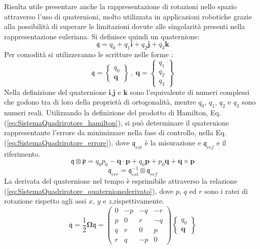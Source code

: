 Risulta utile presentare anche la rappresentazione di rotazioni nello spazio attraverso l'uso di quaternioni, molto utilizzata in applicazioni robotiche grazie alla possibilità di superare le limitazioni dovute alle singolarità presenti nella rappresentazione euleriana.
Si definisce quindi un quaternione:
\[ 
	\mathfrak{q} = q_0 + q_1 \mathbf{i} + q_2 \mathbf{j} + q_3 \mathbf{k}
\]
Per comodità si utilizzeranno le scritture nelle forme :
\[ 
	\mathfrak{q} = \begin{Bmatrix}
		q_0\\
		\mathbf{q}
	\end{Bmatrix} \ , \ \mathbf{q} = \begin{Bmatrix}
		q_1\\
		q_2\\
		q_3
	\end{Bmatrix}
\]
Nella definizione del quaternione $\mathbf{i}$,$\mathbf{j}$ e $\mathbf{k}$ sono l'equivalente di numeri complessi che godono tra di loro della proprietà di ortogonalità, mentre $q_0$, $q_1$, $q_2$ e $q_3$ sono numeri reali. Utilizzando la definizione del prodotto di Hamilton, Eq.  (\ref{eq:SistemaQuadrirotore_hamilton}), si può determinare il quaternione rappresentante l'errore da minimizzare nella fase di controllo, nella Eq. (\ref{eq:SistemaQuadrirotore_errore}), dove $\mathfrak{q}_{est}$ è la misurazione e $ \mathfrak{q}_{ref}$ e il riferimento.
\begin{equation}\label{eq:SistemaQuadrirotore_hamilton}
	\mathfrak{q} \otimes \mathfrak{p} = q_0 p_0 - \mathbf{q} \cdot \mathbf{p} + q_0 \mathbf{p} + p_0 \mathbf{q} + \mathbf{q} \times \mathbf{p}
\end{equation}
\begin{equation}\label{eq:SistemaQuadrirotore_errore}
	\mathfrak{q}_{err} = \mathfrak{q}_{est}^{-1} \otimes \mathfrak{q}_{ref}
\end{equation}
La derivata del quaternione nel tempo è esprimibile attraverso la relazione (\ref{eq:SistemaQuadrirotore_quaternionederivato}), dove $p$, $q$ ed $r$ sono i ratei di rotazione rispetto agli assi $x$, $y$ e $z$,rispettivamente.
\begin{equation}\label{eq:SistemaQuadrirotore_quaternionederivato}
\mathfrak{\dot{q}} = \frac{1}{2} \mathbf{\Omega} \mathfrak{q} =
	\begin{pmatrix}
		0 & -p & -q & -r \\
		p &  0 &  r & -q \\
		q &  r &  0 &  p \\
		r &  q & -p &  0 
	\end{pmatrix}
	\begin{Bmatrix}
		q_0 \\
		\mathbf{q}
	\end{Bmatrix}
\end{equation}
